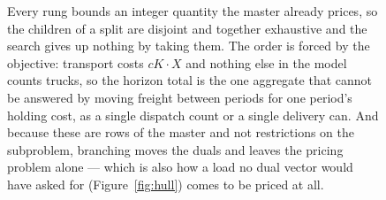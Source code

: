 \begin{figure}[!t]
\caption{Every rung bounds an integer quantity the master already prices,
so the children of a split are disjoint and together exhaustive and the search
gives up nothing by taking them. The order is forced by the objective:
transport costs $cK\cdot X$ and nothing else in the model counts trucks, so
the horizon total is the one aggregate that cannot be answered by moving
freight between periods for one period's holding cost, as a single dispatch
count or a single delivery can. And because these are rows of the master and
not restrictions on the subproblem, branching moves the duals and leaves the
pricing problem alone --- which is also how a load no dual vector would have
asked for (Figure~\ref{fig:hull}) comes to be priced at all.}
\label{fig:tree}
\end{figure}
